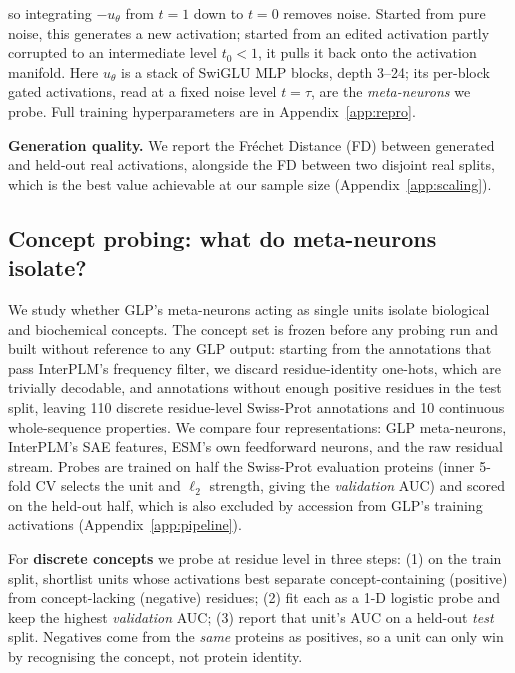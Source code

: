 \documentclass{article}
\begin{document}
so integrating $-u_\theta$ from $t{=}1$ down to $t{=}0$ removes noise. Started from pure noise,
this generates a new activation; started from an edited activation partly corrupted to an intermediate
level $t_0 < 1$, it pulls it back onto the activation manifold. Here $u_\theta$ is a stack of SwiGLU MLP blocks, depth 3--24; its per-block gated activations,
read at a fixed noise level $t{=}\tau$, are the \emph{meta-neurons} we probe. %
Full training hyperparameters are in Appendix~\ref{app:repro}.


\textbf{Generation quality.} We report the Fréchet Distance (FD) between generated and held-out
real activations, alongside the FD between two disjoint real splits, which is the best value
achievable at our sample size (Appendix~\ref{app:scaling}).

\subsection{Concept probing: what do meta-neurons isolate?}
\label{sec:method-probing}

We study whether GLP's meta-neurons acting as single units isolate biological and biochemical concepts. The concept set is frozen before any probing run and
built without reference to any GLP output: starting from the annotations that
pass InterPLM's frequency filter, we
discard residue-identity one-hots, which are trivially decodable, and
annotations without enough positive residues in the test split, leaving 110
discrete residue-level Swiss-Prot annotations and 10 continuous whole-sequence
properties. We compare four representations: GLP meta-neurons, InterPLM's SAE features, ESM's own
feedforward neurons, and the raw residual stream. Probes are trained on half the Swiss-Prot evaluation proteins (inner 5-fold CV selects the unit
and $\ell_2$ strength, giving the \emph{validation} AUC) and scored on the held-out half,
which is also excluded by accession from GLP's training activations (Appendix~\ref{app:pipeline}).


For \textbf{discrete concepts} we probe at residue level in three steps: (1) on the train split,
shortlist units whose activations best separate concept-containing (positive) from
concept-lacking (negative) residues; (2) fit each as a 1-D logistic probe and keep the highest
\emph{validation} AUC; (3) report that unit's AUC on a held-out \emph{test} split. Negatives come
from the \emph{same} proteins as positives, so a unit can only win by recognising the concept, not protein
identity.
\end{document}
